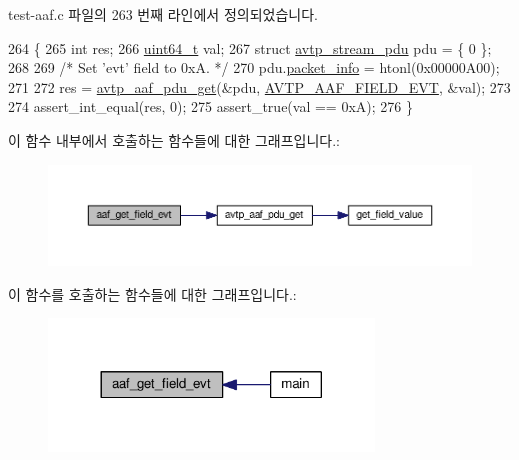 test-\/aaf.\+c 파일의 263 번째 라인에서 정의되었습니다.


\begin{DoxyCode}
264 \{
265     \textcolor{keywordtype}{int} res;
266     \hyperlink{parse_8c_aec6fcb673ff035718c238c8c9d544c47}{uint64\_t} val;
267     \textcolor{keyword}{struct }\hyperlink{structavtp__stream__pdu}{avtp\_stream\_pdu} pdu = \{ 0 \};
268 
269     \textcolor{comment}{/* Set 'evt' field to 0xA. */}
270     pdu.\hyperlink{structavtp__stream__pdu_a737b6c4ff9f6954da39283e7351cbf58}{packet\_info} = htonl(0x00000A00);
271 
272     res = \hyperlink{avtp__aaf_8h_acc4c927b036e22def8e6b6beb3ac6026}{avtp\_aaf\_pdu\_get}(&pdu, \hyperlink{avtp__aaf_8h_a7eaee6c1ebc806c0401dbe7b14cd22dbaa14798600c79bcb32f2d5af24d250c83}{AVTP\_AAF\_FIELD\_EVT}, &val);
273 
274     assert\_int\_equal(res, 0);
275     assert\_true(val == 0xA);
276 \}
\end{DoxyCode}


이 함수 내부에서 호출하는 함수들에 대한 그래프입니다.\+:
\nopagebreak
\begin{figure}[H]
\begin{center}
\leavevmode
\includegraphics[width=350pt]{test-aaf_8c_a525155e10b535fe40f8c4d251df2a115_cgraph}
\end{center}
\end{figure}




이 함수를 호출하는 함수들에 대한 그래프입니다.\+:
\nopagebreak
\begin{figure}[H]
\begin{center}
\leavevmode
\includegraphics[width=245pt]{test-aaf_8c_a525155e10b535fe40f8c4d251df2a115_icgraph}
\end{center}
\end{figure}


